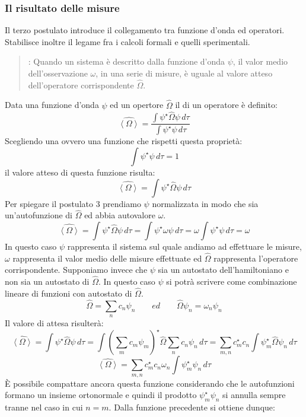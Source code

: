 \subsubsection{Il risultato delle misure}
Il terzo postulato introduce il collegamento tra funzione d'onda ed operatori. Stabilisce inoltre il legame fra i calcoli formali e quelli sperimentali.
\begin{quote}
\textbf{}: Quando un sistema è descritto dalla funzione d'onda $\psi$, il valor medio dell'osservazione $\omega$, in una serie di misure, è uguale al valore atteso dell'operatore corrispondente $\hat{\Omega}$.
\end{quote}
Data una funzione d'onda $\psi$ ed un opertore $\hat{\Omega}$ il \textbf{} di un operatore è definito:
$$\hat{\left \langle \Omega \right \rangle} = \frac{ \int \psi^{\star} \hat{\Omega} \psi \,d\tau }{ \int \psi^{\star} \psi \,d\tau }$$
Scegliendo una \textbf{} ovvero una funzione che rispetti questa proprietà:
$$\int \psi^{\star} \psi \,d\tau = 1$$
il valore atteso di questa funzione risulta:
$$\hat{\left \langle \Omega \right \rangle} = \int \psi^{\star} \hat{\Omega} \psi \,d\tau$$
Per spiegare il postulato 3 prendiamo $\psi$ normalizzata in modo che sia un'autofunzione di $\hat{\Omega}$ ed abbia autovalore $\omega$.
$$\hat{\left \langle \Omega \right \rangle} = \int \psi^{\star} \hat{\Omega} \psi \,d\tau = \int \psi^{\star} \omega \psi \,d\tau = \omega \int \psi^{\star} \psi \,d\tau = \omega$$
In questo caso $\psi$ rappresenta il sistema sul quale andiamo ad effettuare le misure, $\omega$ rappresenta il valor medio delle misure effettuate ed $\hat{\Omega}$ rappresenta l'operatore corrispondente.
Supponiamo invece che $\psi$ sia un autostato dell'hamiltoniano e non sia un autostato di $\hat{\Omega}$. In questo caso $\psi$ si potrà scrivere come combinazione lineare di funzioni con autostato di $\hat{\Omega}$.
$$\hat{\Omega} = \sum_n c_n \psi_n \qquad ed \qquad \hat{\Omega} \psi_n = \omega_n \psi_n$$
Il valore di attesa risulterà:
$$\hat{\left \langle \Omega \right \rangle} = \int \psi^{\star} \hat{\Omega} \psi \,d\tau = \int {\left(\sum_m c_m \psi_m\right)}^{\star} \hat{\Omega} \sum_n c_n \psi_n \,d\tau = \sum_{m,n} c_m^{\star} c_n \int \psi_m^{\star} \hat{\Omega} \psi_n \, d\tau$$
$$\hat{\left \langle \Omega \right \rangle} = \sum_{m,n} c_m^{\star} c_n \omega_n \int \psi_m^{\star} \psi_n \, d\tau$$
È possibile compattare ancora questa funzione considerando che le autofunzioni formano un insieme ortonormale e quindi il prodotto $\psi_m^{\star} \psi_n$ si annulla sempre tranne nel caso in cui $n = m$. Dalla funzione precedente si ottiene dunque:
